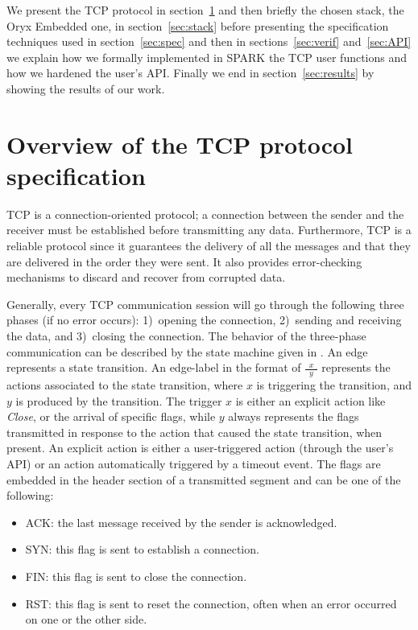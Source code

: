 \documentclass[conference]{IEEEtran}
\def\flag#1{\textsf{#1}\xspace}
\def\syn{\flag{SYN}}
\def\ack{\flag{ACK}}
\def\rst{\flag{RST}}
\def\fin{\flag{FIN}}
\begin{document}

We present the TCP protocol in section~\ref{sec:TCP} and then briefly the
chosen stack, the Oryx Embedded one, in section~\ref{sec:stack}
before presenting the specification techniques used in section~\ref{sec:spec}
and then in sections~\ref{sec:verif} and~\ref{sec:API} we explain how we
formally implemented in SPARK the TCP user functions and how we hardened the
user's API. Finally we end in section~\ref{sec:results} by showing the results
of our work.

\section{Overview of the TCP protocol specification}
\label{sec:TCP}



TCP is a connection-oriented protocol; a connection between the sender and the receiver must be established before transmitting any data. Furthermore, TCP is a reliable protocol since it guarantees the delivery of all the messages and that they are delivered in the order they were sent. It also provides error-checking mechanisms to discard and recover from corrupted data.


Generally, every TCP communication session will go through the following three phases (if no error occurs): 1)~opening the connection, 2)~sending and receiving the data, and 3)~closing the connection. The behavior of the three-phase communication can be described by the state machine given in . An edge represents a state transition.
An edge-label in the format of $\frac{\ \ x \ \ }{\ \ y \ \ }$ represents the actions associated to the state transition, where $x$ is triggering the transition, and $y$ is produced by the transition.
The trigger $x$ is either an explicit action like \textit{Close}, or the arrival of specific flags, while $y$ always represents the flags transmitted in response to the action that caused the state transition, when present.
An explicit action is either a user-triggered action (through the user's API) or an action automatically triggered by a timeout event. The flags are embedded in the header section of a transmitted segment and can be one of the following:
\begin{itemize}
\item \ack: the last message received by the sender is acknowledged.
\item \syn: this flag is sent to establish a connection.
\item \fin: this flag is sent to close the connection.
\item \rst: this flag is sent to reset the connection, often when an error
occurred on one or the other side.
\end{itemize}
\end{document}
